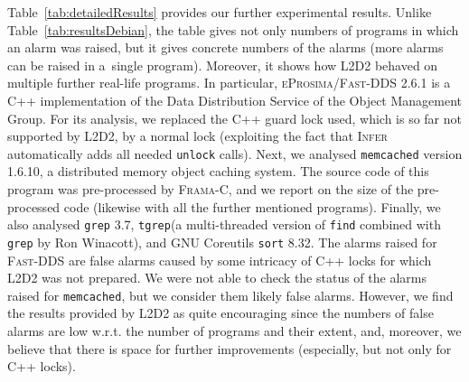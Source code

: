 \documentclass[runningheads]{llncs}
\newcommand{\LLDD}{\textsc{L2D2}\xspace} %
\newcommand{\Infer}{\textsc{Infer}\xspace}
\newcommand{\grep}{\texttt{grep}\xspace}
\newcommand{\sort}{\texttt{sort}\xspace}
\newcommand{\tgrep}{\texttt{tgrep}\xspace}
\newcommand{\find}{\texttt{find}\xspace}
\newcommand{\memcached}{\texttt{memcached}\xspace}
\newcommand{\DDS}{\textsc{Fast-DDS}\xspace}
\newcommand{\eprosimaDDS}{\textsc{eProsima/\DDS}\xspace}
\newcommand{\framac}{\textsc{Frama-C}\xspace}
\newcommand{\mOne}{\texttt{mode\,1}\xspace}
\newcommand{\mTwo}{\texttt{mode\,2}\xspace}
\begin{document}
Table~\ref{tab:detailedResults} provides our further experimental results.
%
Unlike Table~\ref{tab:resultsDebian}, the table gives not only numbers of
programs in which an alarm was raised, but it gives concrete numbers of the
alarms (more alarms can be raised in a~single program).
%
Moreover, it shows how \LLDD behaved on multiple further real-life programs.
%
In particular, \eprosimaDDS 2.6.1 is a C++ implementation of the
Data Distribution Service of the Object Management Group.
%
For its analysis, we replaced the C++ guard lock used, which is so far not
supported by \LLDD, by a normal lock (exploiting the fact that \Infer
automatically adds all needed \texttt{unlock} calls).
%
Next, we analysed \memcached version 1.6.10, a distributed memory object caching
system.
%
The source code of this program was pre-processed by \framac \cite{frama-c},
and we report on the size of the pre-processed code (likewise with all the
further mentioned programs).
%
Finally, we also analysed \grep 3.7, \tgrep (a multi-threaded version of \find
combined with \grep by Ron Winacott), and GNU Coreutils \sort 8.32.
%
The alarms raised for \DDS are false alarms caused by some intricacy of C++
locks for which \LLDD was not prepared.
%
We were not able to check the status of the alarms raised for \memcached, but we
consider them likely false alarms.
%
However, we find the results provided by \LLDD as quite encouraging since the
numbers of false alarms are low w.r.t. the number of programs and their extent,
and, moreover, we believe that there is space for further improvements
(especially, but not only for C++ locks).

%
%
\end{document}
